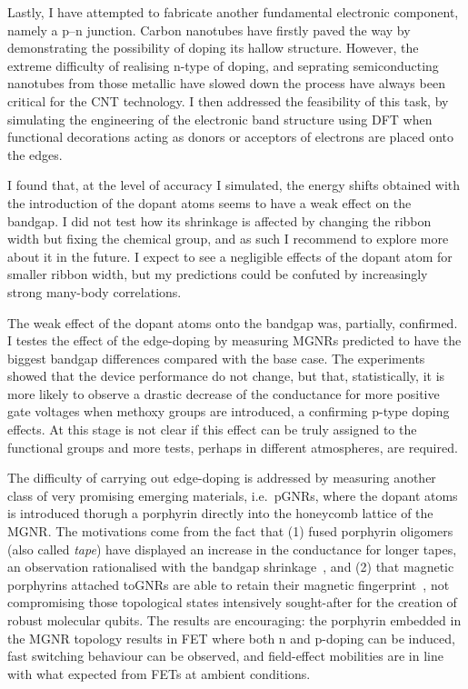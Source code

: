 Lastly, I have attempted to fabricate another fundamental electronic component, namely a p--n junction. Carbon nanotubes have firstly paved the way by demonstrating the possibility of doping its hallow structure. However, the extreme difficulty of realising n-type of doping, and seprating semiconducting nanotubes from those metallic have slowed down the process have always been critical for the \gls{CNT} technology. I then addressed the feasibility of this task, by simulating the engineering of the electronic band structure using \gls{DFT} when functional decorations acting as donors or acceptors of electrons are placed onto the edges.

I found that, at the level of accuracy I simulated, the energy shifts obtained with the introduction of the dopant atoms seems to have a weak effect on the bandgap. I did not test how its shrinkage is affected by changing the ribbon width but fixing the chemical group, and as such I recommend to explore more about it in the future. I expect to see a negligible effects of the dopant atom for smaller ribbon width, but my predictions could be confuted by increasingly strong many-body correlations.

The weak effect of the dopant atoms onto the bandgap was, partially, confirmed. I testes the effect of the edge-doping by measuring \glspl{MGNR} predicted to have the biggest bandgap differences compared with the base case. The experiments showed that the device performance do not change, but that, statistically, it is more likely to observe a drastic decrease of the conductance for more positive gate voltages when methoxy groups are introduced, a confirming p-type doping effects. At this stage is not clear if this effect can be truly assigned to the functional groups and more tests, perhaps in different atmospheres, are required.

The difficulty of carrying out edge-doping is addressed by measuring another class of very promising emerging materials, i.e.\ \glspl{pGNR}, where the dopant atoms is introduced thorugh a porphyrin directly into the honeycomb lattice of the \gls{MGNR}. The motivations come from the fact that (1) fused porphyrin oligomers (also called \textit{tape}) have displayed an increase in the conductance for longer tapes, an observation rationalised with the bandgap shrinkage~\cite{leary2018bias}, and (2) that magnetic porphyrins attached to\glspl{GNR} are able to retain their magnetic fingerprint~\cite{he2017fusing}, not compromising those topological states intensively sought-after for the creation of robust molecular qubits. The results are encouraging: the porphyrin embedded in the \gls{MGNR} topology results in \gls{FET} where both n and p-doping can be induced, fast switching behaviour can be observed, and field-effect mobilities are in line with what expected from \glspl{FET} at ambient conditions.

